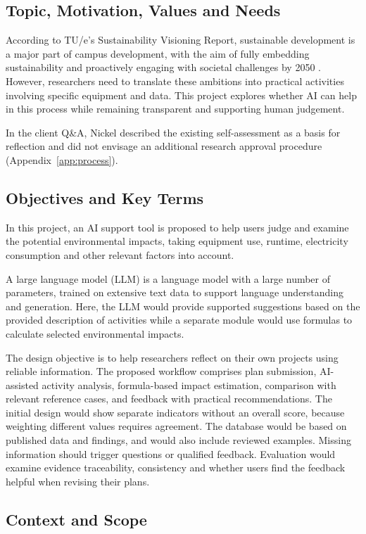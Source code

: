 \documentclass[11pt,a4paper]{article}
\begin{document}
\subsection{Topic, Motivation, Values and Needs}
According to TU/e's Sustainability Visioning Report, sustainable development is a major part of campus development, with the aim of fully embedding sustainability and proactively engaging with societal challenges by 2050 \citep{tue_sustainability_2021}. However, researchers need to translate these ambitions into practical activities involving specific equipment and data. This project explores whether AI can help in this process while remaining transparent and supporting human judgement.

In the client Q\&A, Nickel described the existing self-assessment as a basis for reflection and did not envisage an additional research approval procedure (Appendix~\ref{app:process}).

\subsection{Objectives and Key Terms}
In this project, an AI support tool is proposed to help users judge and examine the potential environmental impacts, taking equipment use, runtime, electricity consumption and other relevant factors into account.

A large language model (LLM) is a language model with a large number of parameters, trained on extensive text data to support language understanding and generation. Here, the LLM would provide supported suggestions based on the provided description of activities while a separate module would use formulas to calculate selected environmental impacts.

The design objective is to help researchers reflect on their own projects using reliable information. The proposed workflow comprises plan submission, AI-assisted activity analysis, formula-based impact estimation, comparison with relevant reference cases, and feedback with practical recommendations. The initial design would show separate indicators without an overall score, because weighting different values requires agreement. The database would be based on published data and findings, and would also include reviewed examples. Missing information should trigger questions or qualified feedback. Evaluation would examine evidence traceability, consistency and whether users find the feedback helpful when revising their plans.

\subsection{Context and Scope}
\end{document}
